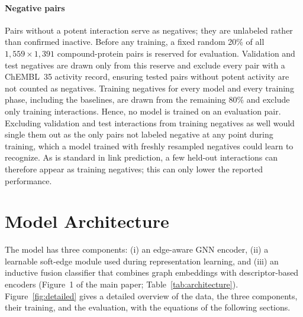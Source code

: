 \documentclass[11pt,letterpaper]{article}
\begin{document}
\paragraph{Negative pairs}
Pairs without a potent interaction serve as negatives; they are unlabeled rather than confirmed inactive. Before any training, a fixed random 20\% of all $1{,}559 \times 1{,}391$ compound-protein pairs is reserved for evaluation. Validation and test negatives are drawn only from this reserve and exclude every pair with a ChEMBL~35 activity record, ensuring tested pairs without potent activity are not counted as negatives. Training negatives for every model and every training phase, including the baselines, are drawn from the remaining 80\% and exclude only training interactions. Hence, no model is trained on an evaluation pair. Excluding validation and test interactions from training negatives as well would single them out as the only pairs not labeled negative at any point during training, which a model trained with freshly resampled negatives could learn to recognize. As is standard in link prediction, a few held-out interactions can therefore appear as training negatives; this can only lower the reported performance.

\section{Model Architecture}
\label{app:architecture}
The model has three components: (i) an edge-aware GNN encoder, (ii) a learnable soft-edge module used during representation learning, and (iii) an inductive fusion classifier that combines graph embeddings with descriptor-based encoders (Figure~1 of the main paper; Table~\ref{tab:architecture}). Figure~\ref{fig:detailed} gives a detailed overview of the data, the three components, their training, and the evaluation, with the equations of the following sections.
\end{document}
